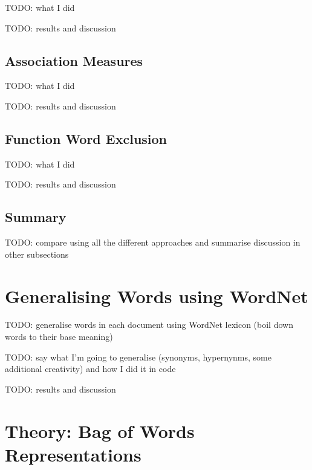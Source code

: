 \documentclass{article}
\begin{document}
TODO: what I did

TODO: results and discussion

\subsection{Association Measures}

TODO: what I did

TODO: results and discussion

\subsection{Function Word Exclusion}

TODO: what I did

TODO: results and discussion

\subsection{Summary}

TODO: compare using all the different approaches and summarise discussion in other subsections

\section{Generalising Words using WordNet}

TODO: generalise words in each document using WordNet lexicon (boil down words to their base meaning)

TODO: say what I'm going to generalise (synonyms, hypernynms, some additional creativity) and how I did it in code

TODO: results and discussion

\section{Theory: Bag of Words Representations}
\end{document}
